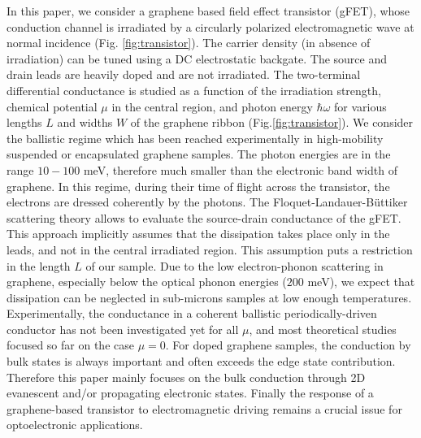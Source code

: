 \documentclass[aps,prb,showpacs,superscriptaddress,twocolumn,10pt,floatfix]{revtex4-1}
\begin{document}
In this paper, we consider a graphene based field effect transistor (gFET), whose conduction channel is irradiated by a circularly polarized electromagnetic wave at normal incidence (Fig. \ref{fig:transistor}). The carrier density (in absence of irradiation) can be tuned using a DC electrostatic backgate. The source and drain leads are heavily doped and are not irradiated. The two-terminal differential conductance is studied as a function of the irradiation strength, chemical potential $\mu$ in the central region, and photon energy $\hbar \omega$ for various lengths $L$ and widths $W$ of the graphene ribbon (Fig.\ref{fig:transistor}). We consider the ballistic regime which has been reached experimentally in high-mobility suspended or encapsulated graphene samples\cite{Calado2014,Banszerus2016,Wang2013One-Dimensional}. The photon energies are in the range $10-100$ meV, therefore much smaller than the electronic band width of graphene. In this regime, during their time of flight across the transistor, the electrons are dressed coherently by the photons. The Floquet-Landauer-B\"{u}ttiker scattering theory allows to evaluate the source-drain conductance of the gFET. This approach implicitly assumes that the dissipation takes place only in the leads, and not in the central irradiated region. This assumption puts a restriction in the length $L$ of our sample. Due to the low electron-phonon scattering\cite{Balandin2011} in graphene, especially below the optical phonon energies ($200$ meV), we expect that dissipation can be neglected in sub-microns samples at low enough temperatures. Experimentally, the conductance in a coherent ballistic periodically-driven conductor has not been investigated yet for all $\mu$, and most theoretical studies focused so far on the case $\mu=0$\cite{Oka2009,Kitagawa2011,Lindner2011,Gu2011}. For doped graphene samples, the conduction by bulk states is always important and often exceeds the edge state contribution. Therefore this paper mainly focuses on the bulk conduction through 2D evanescent and/or propagating electronic states. Finally the response of a graphene-based transistor to electromagnetic driving remains a crucial issue for optoelectronic applications\cite{Mak2012}. 
\end{document}
